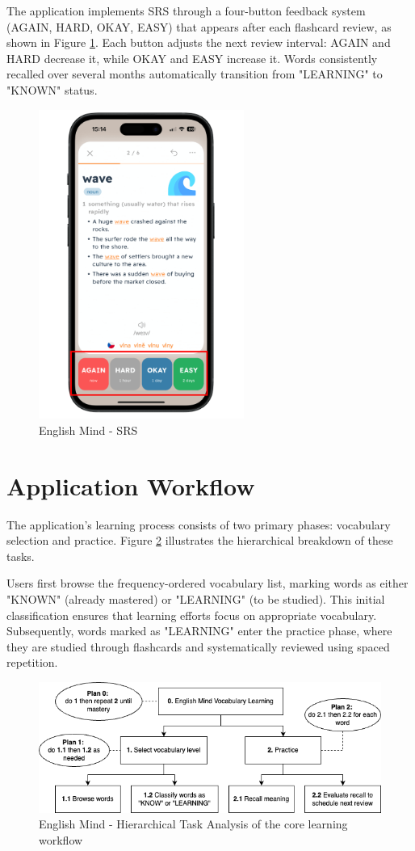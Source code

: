 The application implements SRS through a four-button feedback system (AGAIN, HARD, OKAY, EASY) that appears after each flashcard review, as shown in Figure \ref{fig:em-srs-flashcard}. Each button adjusts the next review interval: AGAIN and HARD decrease it, while OKAY and EASY increase it. Words consistently recalled over several months automatically transition from "LEARNING" to "KNOWN" status.

\begin{figure}[!h]
    \includegraphics[width=0.6\textwidth]{src/figures/em-srs-flashcard.png}
    \caption{English Mind - SRS}
    \label{fig:em-srs-flashcard}
\end{figure}

\section{Application Workflow}

The application's learning process consists of two primary phases: vocabulary selection and practice. Figure \ref{fig:em-hta} illustrates the hierarchical breakdown of these tasks.

Users first browse the frequency-ordered vocabulary list, marking words as either "KNOWN" (already mastered) or "LEARNING" (to be studied). This initial classification ensures that learning efforts focus on appropriate vocabulary. Subsequently, words marked as "LEARNING" enter the practice phase, where they are studied through flashcards and systematically reviewed using spaced repetition.

\vspace{1cm}

\begin{figure}[!h]
    \includegraphics[width=1\textwidth]{src/figures/english_mind_workflow_THA.png}
    \caption{English Mind - Hierarchical Task Analysis of the core learning workflow}
    \label{fig:em-hta}
\end{figure}
